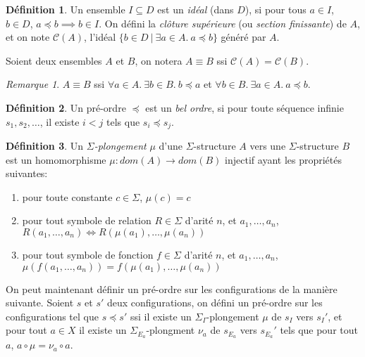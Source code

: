 \documentclass[a4paper, twoside]{scrartcl}
\theoremstyle{plain}%
\theoremstyle{definition}
\newtheorem{defn}{Définition}[section]
\theoremstyle{remark}
\newtheorem*{rem}{Remarque}
\begin{document}
\begin{defn}
  Un ensemble $I \subseteq D$ est un \emph{idéal} (dans $D$), si pour
  tous $a \in I$, $b \in D$, $a \preceq b \implies b \in I$.
  On défini la \emph{clôture supérieure} (ou \emph{section
    finissante}) de $A$, et on note $\mathcal{C}(A)$, l'idéal $\{b \in
  D ~|~ \exists a \in A.~ a \preceq b \}$ généré par $A$.

  Soient deux ensembles $A$ et $B$, on notera $A \equiv B$ ssi
  $\mathcal{C}(A) = \mathcal{C}(B)$.
\end{defn}

\begin{rem}
  $A \equiv B$ ssi $\forall a \in A.~ \exists b \in B.~ b \preceq a$
  et $\forall b \in B.~ \exists a \in A.~ a \preceq b$.
\end{rem}


\begin{defn}
  Un pré-ordre $\preceq$ est un \emph{bel ordre}, si pour toute
  séquence infinie $s_1, s_2, \ldots$, il existe $i < j$ tels que $s_i
  \preceq s_j$.
\end{defn}

\begin{defn}
  Un \emph{$\Sigma$-plongement} $\mu$ d'une $\Sigma$-structure $A$ vers une
  $\Sigma$-structure $B$ est un homomorphisme $\mu : dom(A) \to
  dom(B)$ injectif ayant les propriétés suivantes:
  \begin{enumerate}
  \item pour toute constante $c \in \Sigma$, $\mu(c) = c$
  \item pour tout symbole de relation $R \in \Sigma$ d'arité $n$, et $a_1,
    \ldots, a_n$, $R(a_1, \ldots, a_n) \iff R(\mu(a_1), \ldots, \mu(a_n))$
  \item pour tout symbole de fonction $f \in \Sigma$ d'arité $n$, et $a_1,
    \ldots, a_n$, $\mu(f(a_1, \ldots, a_n)) = f(\mu(a_1), \ldots, \mu(a_n))$
  \end{enumerate}
\end{defn}


On peut maintenant définir un pré-ordre sur les configurations de la
manière suivante.  Soient $s$ et $s'$ deux configurations, on défini
un pré-ordre sur les configurations tel que $s \preceq s'$ ssi il
existe un $\Sigma_I$-plongement $\mu$ de $s_I$ vers $s_I'$, et pour
tout $a \in X$ il existe un $\Sigma_{E_a}$-plongment $\nu_a$ de
$s_{E_a}$ vers $s_{E_a}'$ tels que pour tout $a$, $a \circ \mu = \nu_a
\circ a$.

\end{document}
